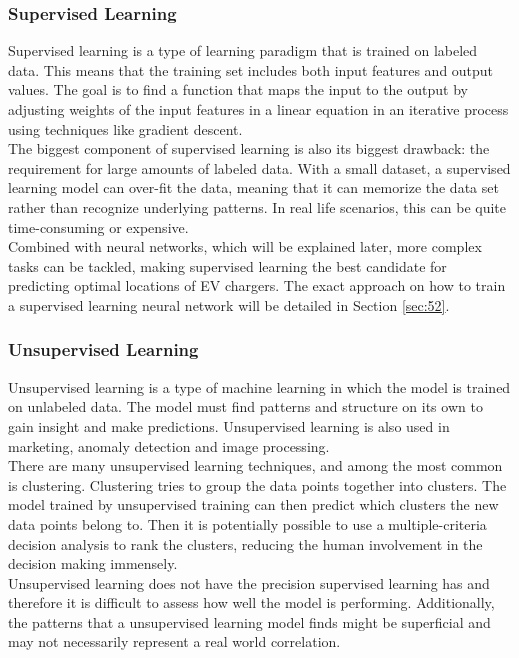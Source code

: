 \subsubsection{Supervised Learning}
Supervised learning is a type of learning paradigm that is trained on labeled data. This means that the training set includes both input features and output values. The goal is to find a function that maps the input to the output by adjusting weights of the input features in a linear equation in an iterative process using techniques like gradient descent.\\
The biggest component of supervised learning is also its biggest drawback: the requirement for large amounts of labeled data. With a small dataset, a supervised learning model can over-fit the data, meaning that it can memorize the data set rather than recognize underlying patterns. In real life scenarios, this can be quite time-consuming or expensive.\\
Combined with neural networks, which will be explained later, more complex tasks can be tackled, making supervised learning the best candidate for predicting optimal locations of EV chargers. The exact approach on how to train a supervised learning neural network will be detailed in Section \ref{sec:52}.
\subsubsection{Unsupervised Learning}\label{sec:ulearingexp}
Unsupervised learning is a type of machine learning in which the model is trained on unlabeled data. The model must find patterns and structure on its own to gain insight and make predictions. Unsupervised learning is also used in marketing, anomaly detection and image processing.\\
There are many unsupervised learning techniques, and among the most common is clustering. Clustering tries to group the data points together into clusters. The model trained by unsupervised training can then predict which clusters the new data points belong to. Then it is potentially possible to use a multiple-criteria decision analysis to rank the clusters, reducing the human involvement in the decision making immensely.\\
Unsupervised learning does not have the precision supervised learning has and therefore it is difficult to assess how well the model is performing. Additionally, the patterns that a unsupervised learning model finds might be superficial and may not necessarily represent a real world correlation.
